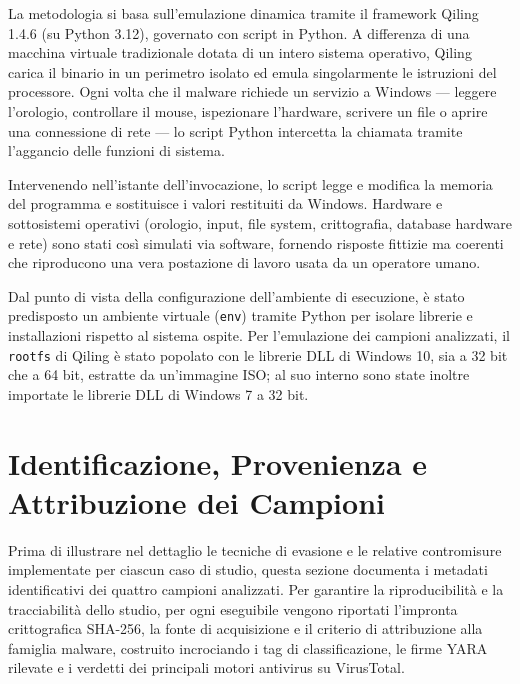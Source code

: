 \documentclass[11pt, a4paper]{article}
\begin{document}
	La metodologia si basa sull'emulazione dinamica tramite il framework Qiling 1.4.6 (su Python 3.12), governato con script in Python. A differenza di una macchina virtuale tradizionale dotata di un intero sistema operativo, Qiling carica il binario in un perimetro isolato ed emula singolarmente le istruzioni del processore. Ogni volta che il malware richiede un servizio a Windows --- leggere l'orologio, controllare il mouse, ispezionare l'hardware, scrivere un file o aprire una connessione di rete --- lo script Python intercetta la chiamata tramite l'aggancio delle funzioni di sistema.
	
	Intervenendo nell'istante dell'invocazione, lo script legge e modifica la memoria del programma e sostituisce i valori restituiti da Windows. Hardware e sottosistemi operativi (orologio, input, file system, crittografia, database hardware e rete) sono stati così simulati via software, fornendo risposte fittizie ma coerenti che riproducono una vera postazione di lavoro usata da un operatore umano.
	
	Dal punto di vista della configurazione dell'ambiente di esecuzione, è stato predisposto un ambiente virtuale (\texttt{env}) tramite Python per isolare librerie e installazioni rispetto al sistema ospite. Per l'emulazione dei campioni analizzati, il \texttt{rootfs} di Qiling è stato popolato con le librerie DLL di Windows 10, sia a 32 bit che a 64 bit, estratte da un'immagine ISO; al suo interno sono state inoltre importate le librerie DLL di Windows 7 a 32 bit.
	
	\section{Identificazione, Provenienza e Attribuzione dei Campioni}
	
	Prima di illustrare nel dettaglio le tecniche di evasione e le relative contromisure implementate per ciascun caso di studio, questa sezione documenta i metadati identificativi dei quattro campioni analizzati. Per garantire la riproducibilità e la tracciabilità dello studio, per ogni eseguibile vengono riportati l'impronta crittografica SHA-256, la fonte di acquisizione e il criterio di attribuzione alla famiglia malware, costruito incrociando i tag di classificazione, le firme YARA rilevate e i verdetti dei principali motori antivirus su VirusTotal.
	
\end{document}
